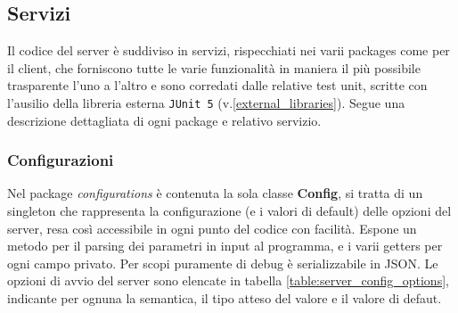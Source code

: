 \documentclass{article}
\begin{document}
    \subsection{Servizi}
    Il codice del server è suddiviso in servizi, rispecchiati nei varii packages come per il client, che forniscono tutte le varie funzionalità in maniera il più possibile trasparente l'uno a l'altro e sono corredati dalle relative test unit, scritte con l'ausilio della libreria esterna \texttt{JUnit 5} (v.\ref{external_libraries}). Segue una descrizione dettagliata di ogni package e relativo servizio.

    \subsubsection{Configurazioni}\label{server_configurations}
    Nel package \emph{configurations} è contenuta la sola classe \textbf{Config}, si tratta di un singleton che rappresenta la configurazione (e i valori di default) delle opzioni del server, resa così accessibile in ogni punto del codice con facilità. Espone un metodo per il parsing dei parametri in input al programma, e i varii getters per ogni campo privato. Per scopi puramente di debug è serializzabile in JSON. Le opzioni di avvio del server sono elencate in tabella \ref{table:server_config_options}, indicante per ognuna la semantica, il tipo atteso del valore e il valore di defaut.
\end{document}
